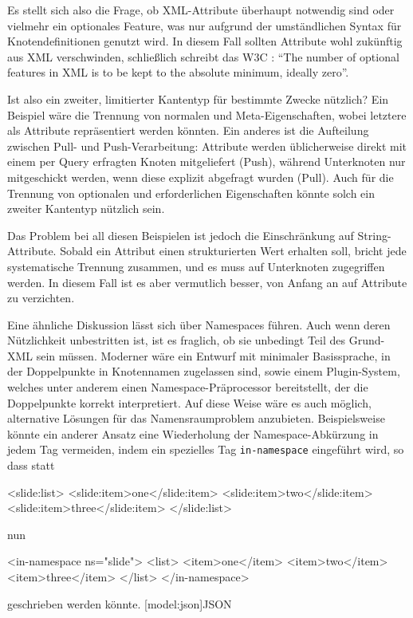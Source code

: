 \documentclass[12pt, a4paper, bibgerm]{scrbook}
\newenvironment{DIFnomarkup}{}{}
\newcommand\icode[1]{\lstinline?#1?}
\newcommand\lsection{}
\begin{document}
Es stellt sich also die Frage, ob XML-Attribute überhaupt notwendig sind
oder vielmehr ein optionales Feature, was nur aufgrund der umständlichen
Syntax für Knotendefinitionen genutzt wird. In diesem Fall
sollten Attribute wohl zukünftig aus XML verschwinden, schließlich
schreibt das W3C \cite{XmlSpec}: "`The number of optional features in XML
is to be kept to the absolute minimum, ideally zero"'.

Ist also ein zweiter, limitierter Kantentyp für bestimmte Zwecke
nützlich? Ein Beispiel wäre die Trennung von normalen und
Meta-Eigenschaften, wobei letztere als Attribute repräsentiert werden
könnten. Ein anderes ist die Aufteilung zwischen Pull- und
Push-Verarbeitung: Attribute werden üblicherweise direkt mit einem per
Query erfragten Knoten mitgeliefert (Push), während Unterknoten nur
mitgeschickt werden, wenn diese explizit abgefragt wurden (Pull). Auch
für die Trennung von optionalen und erforderlichen Eigenschaften könnte
solch ein zweiter Kantentyp nützlich sein.

Das Problem bei all diesen Beispielen ist jedoch die Einschränkung auf
String-Attribute. Sobald ein Attribut einen strukturierten Wert erhalten
soll, bricht jede systematische Trennung zusammen, und es muss auf
Unterknoten zugegriffen werden. In diesem Fall ist es aber vermutlich
besser, von Anfang an auf Attribute zu verzichten.

Eine ähnliche Diskussion lässt sich über Namespaces führen. Auch wenn
deren Nützlichkeit unbestritten ist, ist es fraglich, ob sie unbedingt
Teil des Grund-XML sein müssen. Moderner wäre ein Entwurf mit
minimaler Basissprache, in der Doppelpunkte in Knotennamen zugelassen
sind, sowie einem Plugin-System, welches unter anderem einen
Namespace-Präprocessor bereitstellt, der die Doppelpunkte korrekt
interpretiert. Auf diese Weise wäre es auch möglich, alternative
Lösungen für das Namensraumproblem anzubieten. Beispielsweise könnte ein
anderer Ansatz eine Wiederholung der Namespace-Abkürzung in jedem Tag
vermeiden, indem ein spezielles Tag \icode{in-namespace} eingeführt
wird, so dass statt
\begin{DIFnomarkup}\begin{code}
<slide:list>
  <slide:item>one</slide:item>  
  <slide:item>two</slide:item>  
  <slide:item>three</slide:item>  
</slide:list>
\end{code}\end{DIFnomarkup}
nun
\begin{DIFnomarkup}\begin{code}
<in-namespace ns="slide">
  <list>
    <item>one</item>  
    <item>two</item>  
    <item>three</item>  
  </list>  
</in-namespace>
\end{code}\end{DIFnomarkup}
geschrieben werden könnte.
\lsection[model:json]{JSON}
\end{document}
